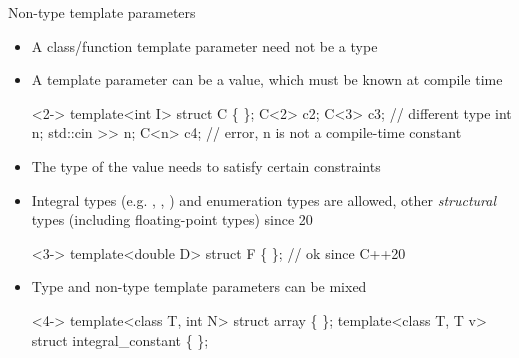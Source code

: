 \begin{frame}[fragile]{Non-type template parameters}
  \begin{itemize}
  \item A class/function template parameter need not be a type
  \item A template parameter can be a value, which must be known at compile time

    \begin{codeblock}<2->{
template<int I> struct C \{ \ddd \};
C<2> c2;
C<3> c3;              // different type
int n; std::cin >> n;
C<n> c4;              // error, n is not a compile-time constant}\end{codeblock}

  \item<3-> The type of the value needs to satisfy certain constraints
  \item<3-> Integral types (e.g. , , ) and
    enumeration types are allowed, other \textit{structural} types (including
    floating-point types) since \Cpp{}20

    \begin{codeblock}<3->{
template<double D> struct F \{ \ddd \}; // ok since C++20}\end{codeblock}

\item<4-> Type and non-type template parameters can be mixed

  \begin{codeblock}<4->{
template<class T, int N> struct array \{ \ddd \};
template<class T, T v> struct integral_constant \{ \ddd \};}\end{codeblock}

  \end{itemize}

\end{frame}
